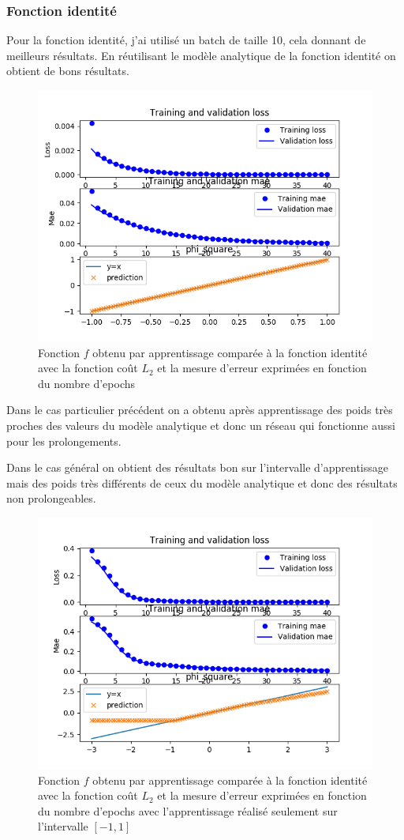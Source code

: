 \documentclass[a4paper,11pt,twoside]{report}
\begin{document}
	\subsubsection{Fonction identité}
	Pour la fonction identité, j'ai utilisé un batch de taille 10, cela donnant de meilleurs résultats. En réutilisant le modèle analytique de la fonction identité on obtient de bons résultats.
	\begin{figure}[H]
		\begin{center}
			\includegraphics[width=0.7\linewidth]{id_b10_ep40_1.png}
			\caption{Fonction $f$ obtenu par apprentissage comparée à la fonction identité avec la fonction coût $L_2$ et la mesure d'erreur exprimées en fonction du nombre d'epochs}
		\end{center}
	\end{figure}
	Dans le cas particulier précédent on a obtenu après apprentissage des poids très proches des valeurs du modèle analytique et donc un réseau qui fonctionne aussi pour les prolongements.
	
	Dans le cas général on obtient des résultats bon sur l'intervalle d'apprentissage mais des poids très différents de ceux du modèle analytique et donc des résultats non prolongeables.
	

	
	\begin{figure}[H]
		\begin{center}
			\includegraphics[width=0.7\linewidth]{prolongement_id.png}
			\caption{Fonction $f$ obtenu par apprentissage comparée à la fonction identité avec la fonction coût $L_2$ et la mesure d'erreur exprimées en fonction du nombre d'epochs avec l'apprentissage réalisé seulement sur l'intervalle $[-1,1]$}
		\end{center}
	\end{figure}
\end{document}

